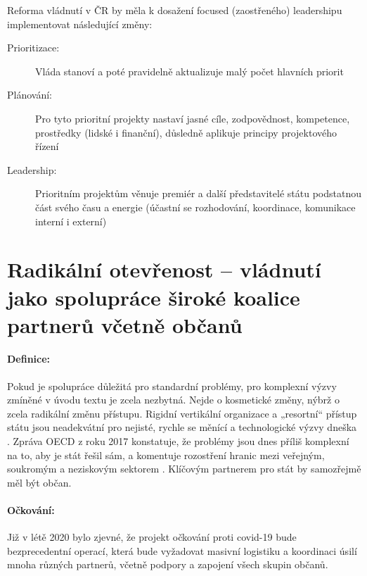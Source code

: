 Reforma vládnutí v ČR by měla k dosažení focused (zaostřeného) leadershipu
implementovat následující změny:
\begin{description}
  \item[Prioritizace:] Vláda stanoví a poté pravidelně aktualizuje malý počet hlavních priorit
  \item[Plánování:] Pro tyto prioritní projekty nastaví jasné cíle, zodpovědnost, kompetence, prostředky (lidské i finanční), důsledně aplikuje principy projektového řízení
  \item[Leadership:] Prioritním projektům věnuje premiér a další představitelé státu podstatnou část svého času a energie (účastní se rozhodování, koordinace, komunikace interní i externí)
\end{description}

\section*{Radikální otevřenost -- vládnutí jako spolupráce široké koalice partnerů včetně občanů}

\paragraph{Definice:}Pokud je spolupráce důležitá pro standardní problémy, pro komplexní výzvy zmíněné v úvodu textu je zcela nezbytná. Nejde o kosmetické změny, nýbrž o zcela radikální změnu přístupu. Rigidní vertikální organizace a „resortní“ přístup státu jsou neadekvátní pro nejisté, rychle se měnící a technologické výzvy dneška \cite{d_eggers_future_2020}. Zpráva OECD z roku 2017 konstatuje, že problémy jsou dnes příliš komplexní na to, aby je stát řešil sám, a komentuje rozostření hranic mezi veřejným, soukromým a neziskovým sektorem \cite{oecd_public_governance_reviews_skills_2020}. Klíčovým partnerem pro stát by samozřejmě měl být občan.

\paragraph{Očkování:} Již v létě 2020 bylo zjevné, že projekt očkování proti covid-19 bude bezprecedentní operací, která bude vyžadovat masivní logistiku a koordinaci úsilí mnoha různých partnerů, včetně podpory a zapojení všech skupin občanů.

